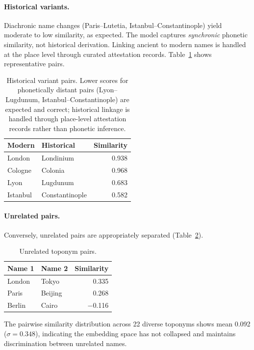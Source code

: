 \documentclass[11pt,a4paper]{article}
\begin{document}
\paragraph{Historical variants.} Diachronic name changes (Paris--Lutetia, Istanbul--Constantinople) yield moderate to low similarity, as expected. The model captures \emph{synchronic} phonetic similarity, not historical derivation. Linking ancient to modern names is handled at the place level through curated attestation records. Table~\ref{tab:historical} shows representative pairs.

\begin{table}[ht]
\centering
\begin{tabular}{ll r}
\toprule
\textbf{Modern} & \textbf{Historical} & \textbf{Similarity} \\
\midrule
London & Londinium & 0.938 \\
Cologne & Colonia & 0.968 \\
Lyon & Lugdunum & 0.683 \\
Istanbul & Constantinople & 0.582 \\
\bottomrule
\end{tabular}
\caption{Historical variant pairs. Lower scores for phonetically distant pairs (Lyon--Lugdunum, Istanbul--Constantinople) are expected and correct; historical linkage is handled through place-level attestation records rather than phonetic inference.}
\label{tab:historical}
\end{table}

\paragraph{Unrelated pairs.} Conversely, unrelated pairs are appropriately separated (Table~\ref{tab:unrelated}).

\begin{table}[ht]
\centering
\begin{tabular}{ll r}
\toprule
\textbf{Name 1} & \textbf{Name 2} & \textbf{Similarity} \\
\midrule
London & Tokyo & 0.335 \\
Paris & Beijing & 0.268 \\
Berlin & Cairo & $-$0.116 \\
\bottomrule
\end{tabular}
\caption{Unrelated toponym pairs.}
\label{tab:unrelated}
\end{table}

\bigskip
The pairwise similarity distribution across 22 diverse toponyms shows mean 0.092 ($\sigma=0.348$), indicating the embedding space has not collapsed and maintains discrimination between unrelated names.
\end{document}
